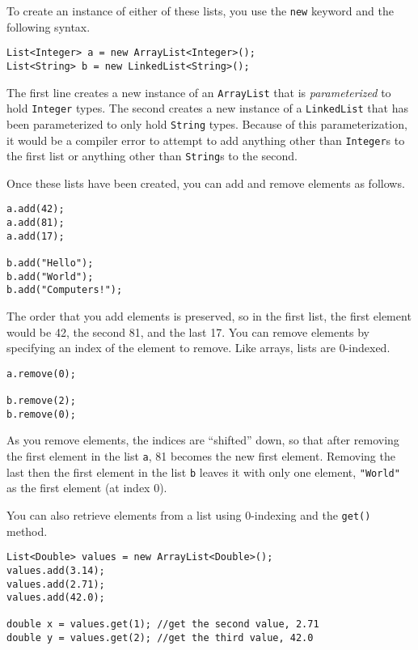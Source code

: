 To create an instance of either of these lists, you use the
\texttt{new} keyword and the following syntax.

\begin{verbatim}
List<Integer> a = new ArrayList<Integer>();
List<String> b = new LinkedList<String>();
\end{verbatim}

The first line creates a new instance of an \texttt{ArrayList}
that is \emph{parameterized} to hold \texttt{Integer} 
types.  The second creates a new instance of a \texttt{LinkedList}
that has been parameterized to only hold \texttt{String}
types.  Because of this parameterization, it would be a 
compiler error to attempt to add anything other than \texttt{Integer}s
to the first list or anything other than \texttt{String}s to the
second.

Once these lists have been created, you can add and remove
elements as follows.

\begin{verbatim}
a.add(42);
a.add(81);
a.add(17);

b.add("Hello");
b.add("World");
b.add("Computers!");
\end{verbatim}

The order that you add elements is preserved, so in the first list, the
first element would be 42, the second 81, and the last 17.  You can
remove elements by specifying an index of the element to remove.
Like arrays, lists are 0-indexed.

\begin{verbatim}
a.remove(0);

b.remove(2);
b.remove(0);
\end{verbatim}

As you remove elements, the indices are ``shifted'' down, so that after
removing the first element in the list \texttt{a}, 81 becomes
the new first element.  Removing the last then the first element in the
list \texttt{b} leaves it with only one element, \texttt{"World"}
as the first element (at index 0).

You can also retrieve elements from a list using 0-indexing and
the \texttt{get()} method. 

\begin{verbatim}
List<Double> values = new ArrayList<Double>();
values.add(3.14);
values.add(2.71);
values.add(42.0);

double x = values.get(1); //get the second value, 2.71
double y = values.get(2); //get the third value, 42.0
\end{verbatim}

